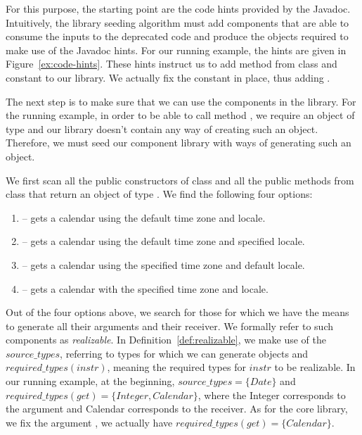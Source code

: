 \documentclass[sigconf,review,anonymous]{acmart}
\begin{document}
For this purpose, the starting point are the code hints provided by the Javadoc.
Intuitively, the library seeding algorithm must add components that are able to consume the
inputs to the deprecated code and produce the objects required to make use
of the Javadoc hints.
%
For our running example, the hints are given in Figure~\ref{ex:code-hints}.
These hints instruct us to add method  from class
 and constant  to our library.
We actually fix the  constant
in place, thus adding .

The next step is to make sure that we can use the components in the library.
For the running example, in order to be able to call method , we require an object of
type  and our library doesn't contain any way of creating such an object.
Therefore, we must seed our component library with ways of generating such an object.

We first scan all the public constructors of class 
and all the public methods from class  that return an object of type . We find the following four options:

\begin{enumerate}
  \item {} -- gets a calendar using the default time zone and locale.
  \item {} -- gets a calendar using the default time zone and specified locale.
  \item {} -- gets a calendar using the specified time zone and default locale.
  \item {} -- gets a calendar with the specified time zone and locale.
\end{enumerate}

%
Out of the four options above, we search for those for which we have the means to generate all their arguments and their receiver. We formally refer to such components as {\em realizable}.
In Definition~\ref{def:realizable}, we make use of the $source\_types$, referring to types
for which we can generate objects and $required\_types(instr)$, meaning the required types
for $instr$ to be realizable. In our running example, at the beginning,
$source\_types=\{Date\}$ and $required\_types(get) = \{Integer, Calendar\}$, where the Integer
corresponds to the argument and Calendar corresponds to the receiver. As for the core library,
we fix the argument , we actually have $required\_types(get) = \{Calendar\}$.
\end{document}
